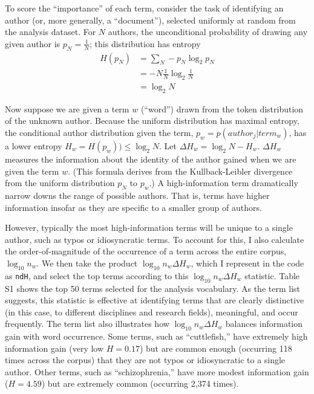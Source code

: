 \documentclass[
  11pt,
]{article}
\begin{document}
To score the ``importance'' of each term, consider the task of identifying an author (or, more generally, a ``document''), selected uniformly at random from the analysis dataset. For \(N\) authors, the unconditional probability of drawing any given author is \(p_N = \frac{1}{N}\); this distribution has entropy \begin{align*}
    H(p_N) &= \sum_{N} - p_N \log_2 p_N\\
         &= - N \frac{1}{N} \log_2 \frac{1}{N}\\
         &= \log_2 N
\end{align*}

Now suppose we are given a term \(w\) (``word'') drawn from the token distribution of the unknown author. Because the uniform distribution has maximal entropy, the conditional author distribution given the term, \(p_w = p(author_j | term_w)\), has a lower entropy \(H_w = H(p_w)) \leq \log_2 N\). Let \(\Delta H_w = \log_2 N - H_w\). \(\Delta H_w\) measures the information about the identity of the author gained when we are given the term \(w\). (This formula derives from the Kullback-Leibler divergence from the uniform distribution \(p_N\) to \(p_w\).) A high-information term dramatically narrow downs the range of possible authors. That is, terms have higher information insofar as they are specific to a smaller group of authors.

However, typically the most high-information terms will be unique to a single author, such as typos or idiosyncratic terms. To account for this, I also calculate the order-of-magnitude of the occurrence of a term across the entire corpus, \(\log_{10} n_w\). We then take the product \(\log_{10} n_w \Delta H_w\), which I represent in the code as \texttt{ndH}, and select the top terms according to this \(\log_{10} n_w \Delta H_w\) statistic. Table S1 shows the top 50 terms selected for the analysis vocabulary. As the term list suggests, this statistic is effective at identifying terms that are clearly distinctive (in this case, to different disciplines and research fields), meaningful, and occur frequently. The term list also illustrates how \(\log_{10} n_w \Delta H_w\) balances information gain with word occurrence. Some terms, such as ``cuttlefish,'' have extremely high information gain (very low \(H = 0.17\)) but are common enough (occurring 118 times across the corpus) that they are not typos or idiosyncratic to a single author. Other terms, such as ``schizophrenia,'' have more modest information gain (\(H = 4.59\)) but are extremely common (occurring 2,374 times).
\end{document}
